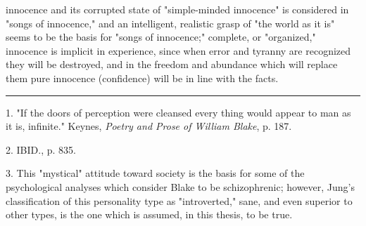 innocence and its corrupted state of "simple-minded innocence" is considered in "songs of innocence," and an intelligent, realistic grasp of "the world
as it is" seems to be the basis for "songs of innocence;" complete, or "organized," innocence is implicit in experience,
since when error and tyranny are recognized they will be destroyed, and in the freedom and abundance which will replace them pure innocence
(confidence) will be in line with the facts.\linebreak
\null\par
\vspace*{-\baselineskip}
\vspace*{\fill}
\noindent\rule{0.25\textwidth}{0.4pt}\par
1. "If the doors of perception were cleansed every thing would appear to man as it is, infinite." Keynes, \textit{Poetry and Prose of William Blake}, p. 187.\par
2. IBID., p. 835.\par
3. This "mystical" attitude toward society is the basis for some of the psychological analyses which consider Blake to be schizophrenic; however, 
Jung's classification of this personality type as "introverted," sane, and even superior to other types, is the one which is assumed, in this thesis, to
be true.\par

\newpage

